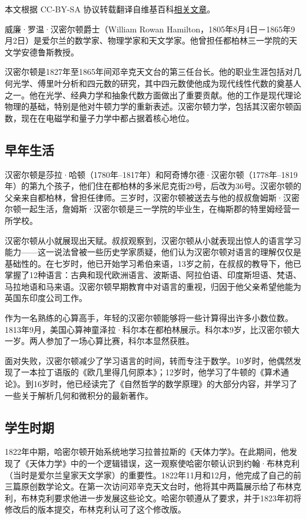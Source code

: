 
本文根据 CC-BY-SA 协议转载翻译自维基百科\href{https://en.wikipedia.org/wiki/William_Rowan_Hamilton}{相关文章}。

威廉·罗温·汉密尔顿爵士（William Rowan Hamilton，1805年8月4日－1865年9月2日）是爱尔兰的数学家、物理学家和天文学家。他曾担任都柏林三一学院的天文学安德鲁斯教授。

汉密尔顿是1827年至1865年间邓辛克天文台的第三任台长。他的职业生涯包括对几何光学、傅里叶分析和四元数的研究，其中四元数使他成为现代线性代数的奠基人之一。他在光学、经典力学和抽象代数方面做出了重要贡献。他的工作是现代理论物理的基础，特别是他对牛顿力学的重新表述。汉密尔顿力学，包括其汉密尔顿函数，现在在电磁学和量子力学中都占据着核心地位。

\subsection{早年生活}  
汉密尔顿是莎拉·哈顿（1780年–1817年）和阿奇博尔德·汉密尔顿（1778年–1819年）的第九个孩子，他们住在都柏林的多米尼克街29号，后改为36号。汉密尔顿的父亲来自都柏林，曾担任律师。三岁时，汉密尔顿被送去与他的叔叔詹姆斯·汉密尔顿一起生活，詹姆斯·汉密尔顿是三一学院的毕业生，在梅斯郡的特里姆经营一所学校。

汉密尔顿从小就展现出天赋。叔叔观察到，汉密尔顿从小就表现出惊人的语言学习能力——这一说法曾被一些历史学家质疑，他们认为汉密尔顿对语言的理解仅仅是基础性的。在七岁时，他已开始学习希伯来语，13岁之前，在叔叔的教导下，他已掌握了12种语言：古典和现代欧洲语言、波斯语、阿拉伯语、印度斯坦语、梵语、马拉地语和马来语。汉密尔顿早期教育中对语言的重视，归因于他父亲希望他能为英国东印度公司工作。

作为一名熟练的心算高手，年轻的汉密尔顿能够将一些计算得出许多小数位数。1813年9月，美国心算神童泽拉·科尔本在都柏林展示。科尔本9岁，比汉密尔顿大一岁。两人参加了一场心算比赛，科尔本显然获胜。

面对失败，汉密尔顿减少了学习语言的时间，转而专注于数学。10岁时，他偶然发现了一本拉丁语版的《欧几里得几何原本》；12岁时，他学习了牛顿的《算术通论》。到16岁时，他已经读完了《自然哲学的数学原理》的大部分内容，并学习了一些关于解析几何和微积分的最新著作。
\subsection{学生时期}
1822年中期，哈密尔顿开始系统地学习拉普拉斯的《天体力学》。在此期间，他发现了《天体力学》中的一个逻辑错误，这一观察使哈密尔顿认识到约翰·布林克利（当时是爱尔兰皇家天文学家）的重要性。1822年11月和12月，他完成了自己的前三篇原创数学论文。在第一次访问邓辛克天文台时，他将其中两篇展示给了布林克利，布林克利要求他进一步发展这些论文。哈密尔顿遵从了要求，并于1823年初将修改后的版本提交，布林克利认可了这个修改版。

